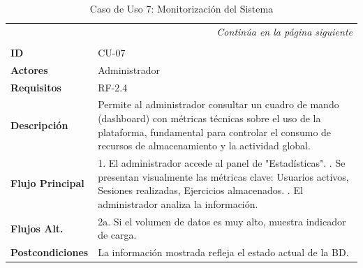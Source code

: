 \clearpage
\begin{longtable}{p{} p{}}
    \toprule
    \endfirsthead
    \toprule
    \endhead
    \midrule
    \multicolumn{2}{r}{\small\itshape Continúa en la página siguiente} \\
    \endfoot
    \bottomrule
    \noalign{\vspace{0.5cm}}
    \caption{Caso de Uso 7: Monitorización del Sistema} \label{cu:7} \\
    \endlastfoot

    \textbf{ID} & CU-07 \\ \midrule
    \textbf{Actores} & Administrador \\ \midrule
    \textbf{Requisitos} & RF-2.4 \\ \midrule
    \textbf{Descripción} & Permite al administrador consultar un cuadro de mando (dashboard) con métricas técnicas sobre el uso de la plataforma, fundamental para controlar el consumo de recursos de almacenamiento y la actividad global. \\ \midrule
    \textbf{Flujo Principal} & 
    1. El administrador accede al panel de "Estadísticas". \newline
    2. Se presentan visualmente las métricas clave: Usuarios activos, Sesiones realizadas, Ejercicios almacenados. \newline
    3. El administrador analiza la información. \\ \midrule
    \textbf{Flujos Alt.} & 
    2a. Si el volumen de datos es muy alto, muestra indicador de carga. \\ \midrule
    \textbf{Postcondiciones} & La información mostrada refleja el estado actual de la BD. \\
\end{longtable}


